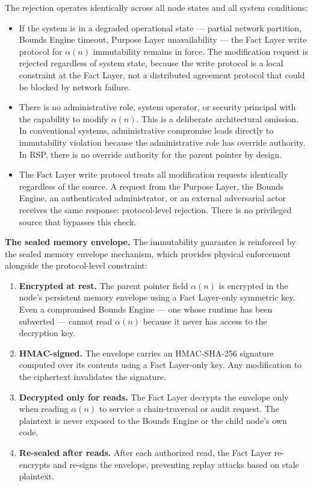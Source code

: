The rejection operates identically across all node states and all system conditions:

\begin{itemize}
    \item[\textbf{Failure resilience.}] If the system is in a degraded operational state — partial network partition, Bounds Engine timeout, Purpose Layer unavailability — the Fact Layer write protocol for $\alpha(n)$ immutability remains in force. The modification request is rejected regardless of system state, because the write protocol is a local constraint at the Fact Layer, not a distributed agreement protocol that could be blocked by network failure.
    \item[\textbf{Administrative override absence.}] There is no administrative role, system operator, or security principal with the capability to modify $\alpha(n)$. This is a deliberate architectural omission. In conventional systems, administrative compromise leads directly to immutability violation because the administrative role has override authority. In RSP, there is no override authority for the parent pointer by design.
    \item[\textbf{Source-equivalence of rejection.}] The Fact Layer write protocol treats all modification requests identically regardless of the source. A request from the Purpose Layer, the Bounds Engine, an authenticated administrator, or an external adversarial actor receives the same response: protocol-level rejection. There is no privileged source that bypasses this check.
\end{itemize}

\medskip
\noindent\textbf{The sealed memory envelope.} The immutability guarantee is reinforced by the sealed memory envelope mechanism, which provides physical enforcement alongside the protocol-level constraint:

\begin{enumerate}
    \item \textbf{Encrypted at rest.} The parent pointer field $\alpha(n)$ is encrypted in the node's persistent memory envelope using a Fact Layer-only symmetric key. Even a compromised Bounds Engine — one whose runtime has been subverted — cannot read $\alpha(n)$ because it never has access to the decryption key.
    \item \textbf{HMAC-signed.} The envelope carries an HMAC-SHA-256 signature computed over its contents using a Fact Layer-only key. Any modification to the ciphertext invalidates the signature.
    \item \textbf{Decrypted only for reads.} The Fact Layer decrypts the envelope only when reading $\alpha(n)$ to service a chain-traversal or audit request. The plaintext is never exposed to the Bounds Engine or the child node's own code.
    \item \textbf{Re-sealed after reads.} After each authorized read, the Fact Layer re-encrypts and re-signs the envelope, preventing replay attacks based on stale plaintext.
\end{enumerate}

